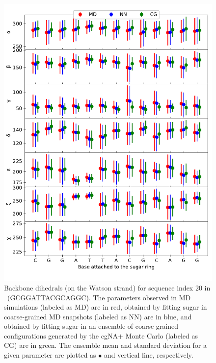 \begin{figure}[H]
	\begin{center}
	\includegraphics[width=15cm]{images/dihed_stats_20_1.pdf}
	\caption{Backbone dihedrals (on the Watson strand) for sequence index 20 in \Lbdna \ (GCGGATTACGCAGGC). The parameters observed in MD simulations (labeled as MD) are in red, obtained by fitting sugar in coarse-grained MD snapshots (labeled as NN) are in blue, and obtained by fitting sugar in an ensemble of coarse-grained configurations generated by the cgNA$+$ Monte Carlo (labeled as CG) are in green. 
    The ensemble mean and standard deviation for a given parameter are plotted as $\bullet$ and vertical line, respectively.
	}
\label{c7:fig5}
\end{center}
\end{figure}

